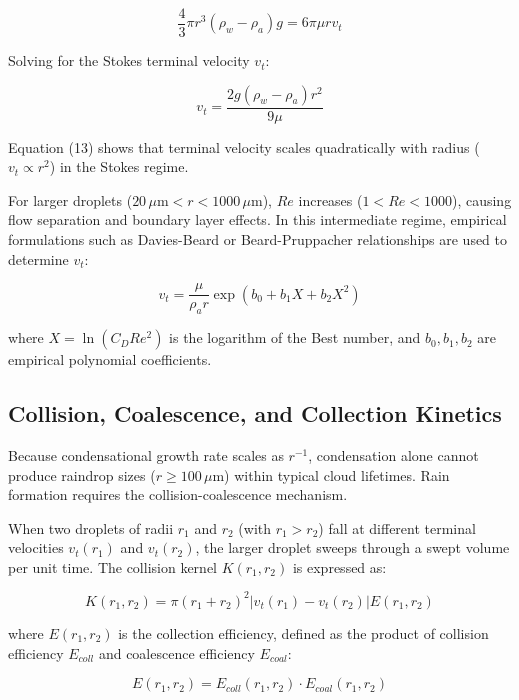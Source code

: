 \documentclass[12pt]{article}
\begin{document}
\begin{equation}
\frac{4}{3} \pi r^3 (\rho_w - \rho_a) g = 6 \pi \mu r v_t
\end{equation}

Solving for the Stokes terminal velocity $v_t$:

\begin{equation}
v_t = \frac{2 g (\rho_w - \rho_a) r^2}{9 \mu}
\end{equation}

Equation (13) shows that terminal velocity scales quadratically with radius ($v_t \propto r^2$) in the Stokes regime.

For larger droplets ($20\,\mu\text{m} < r < 1000\,\mu\text{m}$), $Re$ increases ($1 < Re < 1000$), causing flow separation and boundary layer effects. In this intermediate regime, empirical formulations such as Davies-Beard or Beard-Pruppacher relationships are used to determine $v_t$:

\begin{equation}
v_t = \frac{\mu}{\rho_a r} \exp \left( b_0 + b_1 X + b_2 X^2 \right)
\end{equation}

where $X = \ln(C_D Re^2)$ is the logarithm of the Best number, and $b_0, b_1, b_2$ are empirical polynomial coefficients.

\subsection{Collision, Coalescence, and Collection Kinetics}
Because condensational growth rate scales as $r^{-1}$, condensation alone cannot produce raindrop sizes ($r \ge 100\,\mu\text{m}$) within typical cloud lifetimes. Rain formation requires the collision-coalescence mechanism.

When two droplets of radii $r_1$ and $r_2$ (with $r_1 > r_2$) fall at different terminal velocities $v_t(r_1)$ and $v_t(r_2)$, the larger droplet sweeps through a swept volume per unit time. The collision kernel $K(r_1, r_2)$ is expressed as:

\begin{equation}
K(r_1, r_2) = \pi (r_1 + r_2)^2 |v_t(r_1) - v_t(r_2)| E(r_1, r_2)
\end{equation}

where $E(r_1, r_2)$ is the collection efficiency, defined as the product of collision efficiency $E_{coll}$ and coalescence efficiency $E_{coal}$:

\begin{equation}
E(r_1, r_2) = E_{coll}(r_1, r_2) \cdot E_{coal}(r_1, r_2)
\end{equation}
\end{document}
